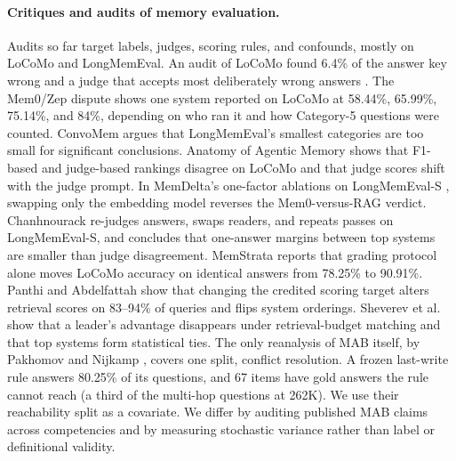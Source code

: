 \paragraph{Critiques and audits of memory evaluation.}
Audits so far target labels, judges, scoring rules, and confounds, mostly on LoCoMo and LongMemEval. An audit of LoCoMo found 6.4\% of the answer key wrong and a judge that accepts most deliberately wrong answers \citep{penfield2026locomoaudit}. The Mem0/Zep dispute \citep{chhikara2025mem0,rasmussen2025zep,mem0zep2025issue,zep2025liesblog} shows one system reported on LoCoMo at 58.44\%, 65.99\%, 75.14\%, and 84\%, depending on who ran it and how Category-5 questions were counted. ConvoMem \citep{pakhomov2025convomem} argues that LongMemEval's smallest categories are too small for significant conclusions. Anatomy of Agentic Memory \citep{jiang2026anatomy} shows that F1-based and judge-based rankings disagree on LoCoMo and that judge scores shift with the judge prompt. In MemDelta's one-factor ablations on LongMemEval-S \citep{wang2026memdelta}, swapping only the embedding model reverses the Mem0-versus-RAG verdict. Chanhnourack \citep{chanhnourack2026auditing} re-judges answers, swaps readers, and repeats passes on LongMemEval-S, and concludes that one-answer margins between top systems are smaller than judge disagreement. MemStrata \citep{yadav2026memstrata} reports that grading protocol alone moves LoCoMo accuracy on identical answers from 78.25\% to 90.91\%. Panthi and Abdelfattah \citep{panthi2026sameranking} show that changing the credited scoring target alters retrieval scores on 83--94\% of queries and flips system orderings. Sheverev et al. \citep{sheverev2026beyond} show that a leader's advantage disappears under retrieval-budget matching and that top systems form statistical ties. The only reanalysis of MAB itself, by Pakhomov and Nijkamp \citep{pakhomov2026bookkeeping}, covers one split, conflict resolution. A frozen last-write rule answers 80.25\% of its questions, and 67 items have gold answers the rule cannot reach (a third of the multi-hop questions at 262K). We use their reachability split as a covariate. We differ by auditing published MAB claims across competencies and by measuring stochastic variance rather than label or definitional validity.

